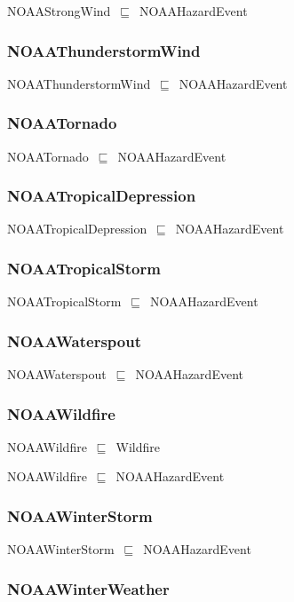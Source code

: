 \documentclass{article}
\begin{document}
NOAAStrongWind~\ensuremath{\sqsubseteq}~NOAAHazardEvent~

\subsubsection*{NOAAThunderstormWind}

NOAAThunderstormWind~\ensuremath{\sqsubseteq}~NOAAHazardEvent~

\subsubsection*{NOAATornado}

NOAATornado~\ensuremath{\sqsubseteq}~NOAAHazardEvent~

\subsubsection*{NOAATropicalDepression}

NOAATropicalDepression~\ensuremath{\sqsubseteq}~NOAAHazardEvent~

\subsubsection*{NOAATropicalStorm}

NOAATropicalStorm~\ensuremath{\sqsubseteq}~NOAAHazardEvent~

\subsubsection*{NOAAWaterspout}

NOAAWaterspout~\ensuremath{\sqsubseteq}~NOAAHazardEvent~

\subsubsection*{NOAAWildfire}

NOAAWildfire~\ensuremath{\sqsubseteq}~Wildfire~

NOAAWildfire~\ensuremath{\sqsubseteq}~NOAAHazardEvent~

\subsubsection*{NOAAWinterStorm}

NOAAWinterStorm~\ensuremath{\sqsubseteq}~NOAAHazardEvent~

\subsubsection*{NOAAWinterWeather}
\end{document}
